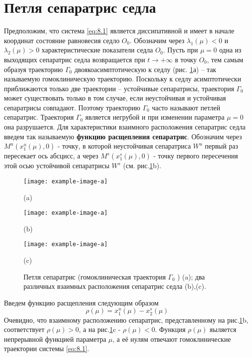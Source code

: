 \section{Петля сепаратрис седла}%

Предположим, что система \eqref{eq:8.1} является диссипативной и имеет в начале
координат состояние равновесия седло $O_0$. Обозначим через $\lambda_1(\mu)<0$ 
и $\lambda_2(\mu) > 0$
характеристические показатели седла $O_0$. Пусть при $\mu=0$ одна из выходящих
сепаратрис седла возвращается при $t \to + \infty$ в точку $O_0$, тем самым образуя
траекторию $\Gamma_0$ двоякоасимптотическую к седлу (рис. \ref{fig:9.5}а) – так называемую
гомоклиническую траекторию. Поскольку к седлу асимптотически
приближаются только две траектории – устойчивые сепаратрисы, траектория $\Gamma_0$
может существовать только в том случае, если неустойчивая и устойчивая
сепаратрисы совпадают. Поэтому траекторию $\Gamma_0$ часто называют петлей
сепаратрис. Траектория $\Gamma_0$ является негрубой и при изменении параметра $\mu=0$ она
разрушается. Для характеристики взаимного расположения сепаратрис седла
введем так называемую \textbf{функцию расщепления сепаратрис}. Обозначим через
$M^u(x_1^u(\mu),0)$ - точку, в которой неустойчивая сепаратриса $W^u$ 
 первый раз
 пересекает ось абсцисс, а через $M^s(x_1^s(\mu),0)$ - точку первого пересечения
 этой осью устойчивой сепаратрисы $W^s$ (см. рис.\ref{fig:9.5}b).
\begin{figure}[h]
        \centering
        \begin{minipage}{0.33\linewidth}
                \centering
                \texttt{[image: example-image-a]}

                (a)
        \end{minipage}
        \vfill
        \begin{minipage}{0.33\linewidth}
                \centering
                \texttt{[image: example-image-a]}
  
                (b)
        \end{minipage}
        \vfill
        \begin{minipage}{0.33\linewidth}
                \centering
                \texttt{[image: example-image-a]}

                (c)
        \end{minipage}
        \vfill
        \caption{Петля сепаратрис (гомоклиническая траектория $\Gamma_0$ ) (a);
                два различных взаимных расположения сепаратрис седла (b),(c).}
        \label{fig:9.5}
\end{figure}
Введем функцию расщепления следующим образом
\begin{equation}
        \label{eq:9.9}
        \rho(\mu) = x_1^u(\mu) - x_2^s(\mu)
\end{equation}
Очевидно, что взаимному расположению сепаратрис, представленному на рис.\ref{fig:9.5}b, соответствует 
$\rho(\mu) > 0 $, а на рис.\ref{fig:9.5}c - $\rho(\mu) < 0.$ Функция $\rho(\mu)$ 
яыляется непрерывной функцией параметра $\mu$, а её нулям отвечают гомоклинические траектории системы
\eqref{eq:8.1}.

